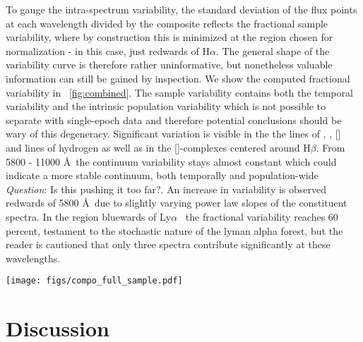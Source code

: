 \documentclass{aa}    %
\newcommand{\figref}[1]{\ref{fig:#1}}
\newcommand{\Fig}[1]{\figurename~\figref{#1}}
\newcommand{\fig}[1]{\Fig{#1}}
\newcommand{\figlabel}[1]{\label{fig:#1}}
\newcommand{\sectionname}{Section}
\newcommand{\Sect}[1]{\sectionname~\ref{sect:#1}}
\newcommand{\sect}[1]{\Sect{#1}}
\newcommand{\sectlabel}[1]{\label{sect:#1}}
\newcommand{\lya}{Ly$\alpha$}
\newcommand{\hb}{H$\beta$}
\newcommand{\ha}{H$\alpha$}
\newcommand{\oiii}{[\ion{O}{iii}]}
\newcommand{\feii}{[\ion{Fe}{ii}]}
\newcommand{\civ}{\ion{C}{iv}}
\newcommand{\mgii}{\ion{Mg}{ii}}
\newcommand{\todo}[3]{{\color{#2}\emph{#1}: #3}}
\newcommand{\qtodo}[1]{\todo{Question}{red}{#1}}
\begin{document}
 To gauge the intra-spectrum variability, the standard deviation of the flux points at each wavelength divided by the composite reflects the fractional sample variability, where by construction this is minimized at the region chosen for normalization - in this case, just redwards of \ha. The general shape of the variability curve is therefore rather uninformative, but nonetheless valuable information can still be gained by inspection. We show the computed fractional variability in \fig{combined}. The sample variability contains both the temporal variability and the intrinsic population variability which is not possible to separate with single-epoch data and therefore potential conclusions should be wary of this degeneracy.
 Significant variation is visible in the the lines of \civ, \mgii, \oiii~ and lines of hydrogen as well as in the \feii-complexes centered around \hb. From 5800 - 11000 \AA~the continuum variability stays almost constant which could indicate a more stable continuum, both temporally and population-wide \qtodo{Is this pushing it too far?}. An increase in variability is observed redwards of 5800 \AA~due to slightly varying power law slopes of the constituent spectra. In the region bluewards of \lya~ the fractional variability reaches 60 percent, testament to the stochastic nature of the lyman alpha forest, but the reader is cautioned that only three spectra contribute significantly at these wavelengths.  
  
\begin{figure*}[hbtp]
\centering
\texttt{[image: figs/compo\_full\_sample.pdf]}
\caption[]{X-shooter quasar weighted arithmetic composite on a linear wavelength scale. The position of several prominent emission lines are marked. Overplot is the corresponding composite generated from the full sample of SDSS quasars fulfilling the selection criteria and general agreement is observed. In red and green is shown the results from fitting both a pure and a broken power-law to the regions specified in \sect{results} and they are observed to be consistent.}
\figlabel{composite}
\end{figure*}

\section{Discussion}  \sectlabel{discuss}
\end{document}
